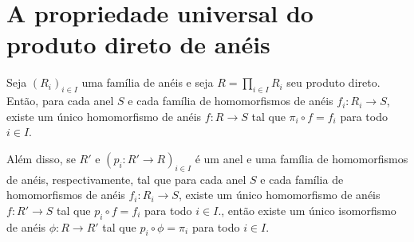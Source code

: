 \section{A propriedade universal do produto direto de anéis}
\begin{theorem}
    Seja $(R_i)_{i \in I}$ uma família de anéis e seja $R=\prod_{i \in I}R_i$ seu produto direto. Então, para cada anel $S$ e cada família de homomorfismos de anéis $f_i:R_i\rightarrow S$, existe um único homomorfismo de anéis $f:R\rightarrow S$ tal que $\pi_i\circ f=f_i$ para todo $i \in I$.
    \begin{figure}[H]
        \centering
    \end{figure}

    Além disso, se $R'$ e $(p_i:R'\rightarrow R)_{i \in I}$ é um anel e uma família de homomorfismos de anéis, respectivamente, tal que para cada anel $S$ e cada família de homomorfismos de anéis $f_i:R_i\rightarrow S$, existe um único homomorfismo de anéis $f:R'\rightarrow S$ tal que $p_i\circ f=f_i$ para todo $i \in I$., então existe um único isomorfismo de anéis $\phi: R\rightarrow R'$ tal que $p_i\circ \phi=\pi_i$ para todo $i \in I$.
\end{theorem}

